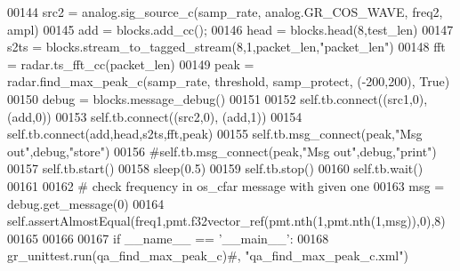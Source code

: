 \begin{DoxyCode}
00144         src2 = analog.sig\_source\_c(samp\_rate, analog.GR\_COS\_WAVE, freq2, ampl)
00145         add = blocks.add\_cc();
00146         head = blocks.head(8,test\_len)
00147         s2ts = blocks.stream\_to\_tagged\_stream(8,1,packet\_len,\textcolor{stringliteral}{"packet\_len"})
00148         fft = radar.ts\_fft\_cc(packet\_len)
00149         peak = radar.find\_max\_peak\_c(samp\_rate, threshold, samp\_protect, (-200,200), \textcolor{keyword}{True})
00150         debug = blocks.message\_debug()
00151         
00152         self.tb.connect((src1,0), (add,0))
00153         self.tb.connect((src2,0), (add,1))
00154         self.tb.connect(add,head,s2ts,fft,peak)
00155         self.tb.msg\_connect(peak,\textcolor{stringliteral}{"Msg out"},debug,\textcolor{stringliteral}{"store"})
00156         \textcolor{comment}{#self.tb.msg\_connect(peak,"Msg out",debug,"print")}
00157         self.tb.start()
00158         sleep(0.5)
00159         self.tb.stop()
00160         self.tb.wait()
00161         
00162         \textcolor{comment}{# check frequency in os\_cfar message with given one}
00163         msg = debug.get\_message(0)
00164         self.assertAlmostEqual(freq1,pmt.f32vector\_ref(pmt.nth(1,pmt.nth(1,msg)),0),8)
00165 
00166 
00167 \textcolor{keywordflow}{if} \_\_name\_\_ == \textcolor{stringliteral}{'\_\_main\_\_'}:
00168     gr\_unittest.run(qa\_find\_max\_peak\_c)\textcolor{comment}{#, "qa\_find\_max\_peak\_c.xml")}
\end{DoxyCode}
